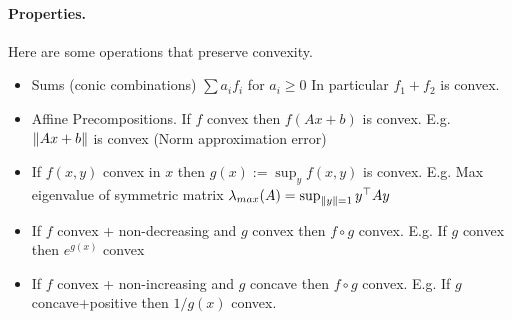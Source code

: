 \documentclass[answers]{exam}
\begin{document}
    \paragraph*{Properties.} Here are some operations that preserve convexity.
    \begin{itemize}
        \item Sums (conic combinations) $\sum a_i f_i$ for $a_i\geq 0$ \newline
        In particular $f_1 + f_2$ is convex.
        \item Affine Precompositions. If $f$ convex then $f(Ax + b)$ is convex. \newline
        E.g. $\left\lVert Ax + b \right\rVert$ is convex (Norm approximation error)
        \item If $f(x,y)$ convex in $x$ then $g(x) := \sup_{y}f(x,y)$ is convex.\newline
        E.g. Max eigenvalue of symmetric matrix $\lambda_{max}(A) = \sup_{\left\lVert y \right\rVert=1}y^\top A y$
        \item If $f$ convex + non-decreasing and $g$ convex then $f\circ g$ convex. \newline
        E.g. If $g$ convex then $e^{g(x)}$ convex
        \item If $f$ convex + non-increasing and $g$ concave then $f\circ g$ convex.\newline
        E.g. If $g$ concave+positive then $1/g(x)$ convex.
    \end{itemize}
\end{document}

